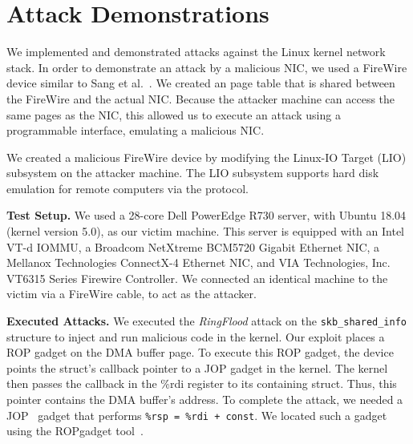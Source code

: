 \section{Attack Demonstrations}\label{Sec:setup}


We implemented and demonstrated \compound attacks against the Linux kernel network stack. 
In order to demonstrate an attack by a malicious NIC, we used a FireWire device similar to Sang et al.~\cite{SLND10}. We created an \iova{} page table that is shared between the FireWire and the actual NIC. Because the attacker machine can access the same pages as the NIC, this allowed us to execute an attack using a programmable interface, emulating a malicious NIC.


We created a malicious FireWire device by modifying the Linux-IO Target (LIO) subsystem on the attacker machine. The LIO subsystem supports hard disk emulation for remote computers via the \spb{} protocol. 

\smallskip
\noindent\textbf{Test Setup.}
We used a 28-core Dell PowerEdge R730 server, with Ubuntu 18.04 (kernel version 5.0), as our victim machine. This server is equipped with an Intel VT-d IOMMU, a Broadcom NetXtreme BCM5720 Gigabit Ethernet NIC, a Mellanox Technologies ConnectX-4 Ethernet NIC, and VIA Technologies, Inc. VT6315 Series Firewire Controller. We connected an identical machine to the victim via a FireWire cable, to act as the attacker. 

\smallskip
\noindent\textbf{Executed Attacks.}
We executed the \textit{RingFlood} attack on the \texttt{skb\_shared\_info} structure to inject and run malicious code in the kernel.
Our exploit places a ROP gadget on the DMA buffer page. To execute this ROP gadget, the device points the struct's callback pointer to a JOP gadget in the kernel. The kernel then passes the callback in the \%rdi register to its containing struct. Thus, this pointer contains the DMA buffer's address. 
To complete the attack, we needed a JOP~\cite{BJFL11} gadget that performs \texttt{\%rsp = \%rdi + const}. We located such a gadget using the ROPgadget tool~\cite{ROPgadget}.

